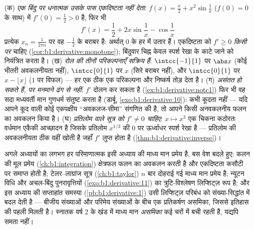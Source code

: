 \begin{remark}[अवकलजों की सामान्य भूलें]
(क) \emph{एक बिंदु पर धनात्मक  उसके पास एकदिष्टता नहीं देता}: $f(x) =
\frac x2 + x^2\sin\frac1x$ ($f(0) = 0$ के साथ) में $f'(0) = \frac12 > 0$ है,
फिर भी
\[
f'(x) = \frac12 + 2x\sin\frac1x - \cos\frac1x
\]
प्रत्येक $x_n = \frac{1}{2\pi n}$ पर वह $-\frac12$ के बराबर है: अर्थात् $0$
के हर  में उतार हैं। एकदिष्टता को $f' \geq 0$ \emph{किसी  पर}
चाहिए (\cref{cor:b1:derivative:monotone}); बिंदुवार चिह्न केवल स्पर्श रेखा
के काटे जाने को नियंत्रित करता है। (ख) \emph{रोल की तीनों परिकल्पनाएँ सक्रिय
हैं}: $\intcc{-1}{1}$ पर $\abs x$ (कोई भीतरी अवकलनीयता नहीं), $\intcc{0}{1}$
पर $x$ (सिरे बराबर नहीं), और $\intcc{0}{1}$ पर $x - \lfloor x\rfloor$ ($1$
पर  विफल) --- हर एक ठीक एक परिकल्पना और निष्कर्ष तोड़ देता है। (ग)
\emph{ असंतत हो सकते हैं, पर मनमाने ढंग से नहीं}: $f'$ दोलन कर सकता है
(\cref{ex:b1:derivative:notc1}) फिर भी वह सदा मध्यवर्ती मान गुणधर्म संतुष्ट
करता है (डार्बू, \cref{exo:b1:derivative:10}):  कभी कूदता नहीं --- यदि
आपने कूद वाली कोई एकपक्षीय ``अवकलज-सीमा'' संगणित की है, तो आपने किसी
अनवकलनीय फलन का अवकलन किया है। (घ) \emph{प्रतिलोम वाले सूत्र को $f' \neq 0$
चाहिए}: $x \mapsto x^3$ एक चिकना कठोरतः वर्धमान एकैकी आच्छादन है जिसके
प्रतिलोम $x^{1/3}$ की $0$ पर ऊर्ध्वाधर स्पर्श रेखा है --- प्रतिलोम की
अवकलनीयता ठीक वहीं खोती है जहाँ $f'$ लुप्त होता है
(\cref{thm:b1:derivative:inverse})।
\end{remark}

\begin{remark}[माध्य मान प्रमेय आगे कहाँ काम करती है]
अगले अध्यायों का लगभग हर परिमाणात्मक  इसी अध्याय की माध्य मान प्रमेय है,
बस वेश बदले हुए: कलन की मूल प्रमेय (\cref{ch:b1:integration}) क्षेत्रफल फलन
का अवकलन करती है और एकदिष्टता कसौटी पर समाप्त होती है; टेलर--लाग्रांज सूत्र
(\cref{ch:b1:taylor}) $n$ बार दोहराई गई माध्य मान प्रमेय है; न्यूटन विधि और
अचल-बिंदु पुनरावृत्तियों (\cref{exo:b1:derivative:11}) का त्रुटि-विश्लेषण
लिप्शिट्ज़ रूप है; और इस अध्याय की सप्ताहांत समस्या
(\cref{pb:b1:derivative:1}) उसी लिप्शिट्ज़ परिबंध को संख्या-सिद्धांत में बदल
देती है --- बीजीय संख्याओं और परिमेय संख्याओं के बीच एक प्रतिकर्षण असमिका,
जिससे इतिहास की पहली  मिलती है। स्नातक वर्ष 2 के खंड में माध्य
मान \emph{असमिका} कई चरों में बची रहती है, यद्यपि समता नहीं।
\end{remark}

